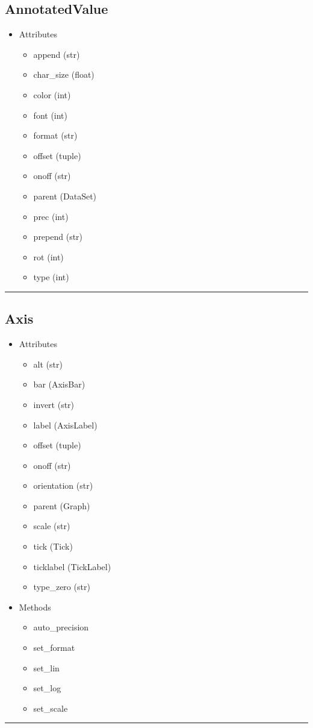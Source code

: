 \documentclass[10pt]{article}
\begin{document}
\begin{multicols}{4}
\subsection*{\footnotesize AnnotatedValue}
\begin{itemize}
\item Attributes
\begin{itemize}
\item append (str)
\item char\_size (float)
\item color (int)
\item font (int)
\item format (str)
\item offset (tuple)
\item onoff (str)
\item parent (DataSet)
\item prec (int)
\item prepend (str)
\item rot (int)
\item type (int)
\end{itemize}
\end{itemize}
\vspace{0.5em}
\hrule
\vspace{0.1em}
\subsection*{\footnotesize Axis}
\begin{itemize}
\item Attributes
\begin{itemize}
\item alt (str)
\item bar (AxisBar)
\item invert (str)
\item label (AxisLabel)
\item offset (tuple)
\item onoff (str)
\item orientation (str)
\item parent (Graph)
\item scale (str)
\item tick (Tick)
\item ticklabel (TickLabel)
\item type\_zero (str)
\end{itemize}
\item Methods
\begin{itemize}
\item auto\_precision
\item set\_format
\item set\_lin
\item set\_log
\item set\_scale
\end{itemize}
\end{itemize}
\vspace{0.5em}
\hrule
\vspace{0.1em}

\end{multicols}
\end{document}
